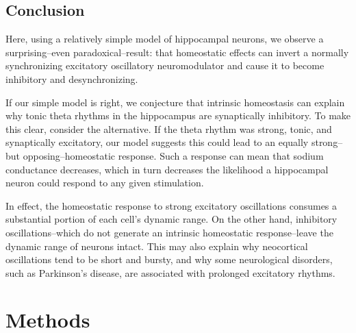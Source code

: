 \documentclass{article}
\begin{document}
\subsection*{Conclusion}
 Here, using a relatively simple model of hippocampal neurons, we observe a surprising--even paradoxical--result: that homeostatic effects can invert a normally synchronizing excitatory oscillatory neuromodulator and cause it to become inhibitory and desynchronizing.
 
 If our simple model is right, we conjecture that intrinsic homeostasis can explain why tonic theta rhythms in the hippocampus are synaptically inhibitory. To make this clear, consider the alternative. If the theta rhythm was strong, tonic, and synaptically excitatory, our model suggests this could lead to an equally strong--but opposing--homeostatic response. Such a response can mean that sodium conductance decreases, which in turn decreases the likelihood a hippocampal neuron could respond to any given stimulation. 

In effect, the homeostatic response to strong excitatory oscillations consumes a substantial portion of each cell's dynamic range. On the other hand, inhibitory oscillations--which do not generate an intrinsic homeostatic response--leave the dynamic range of neurons intact. This may also explain why neocortical oscillations tend to be short and bursty, and why some neurological disorders, such as Parkinson's disease, are associated with prolonged excitatory rhythms.


\section*{Methods}
\end{document}
